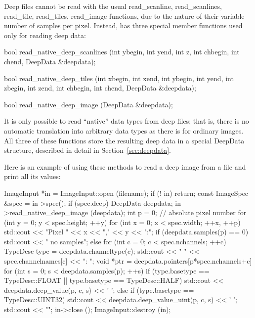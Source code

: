 Deep files cannot be read with the usual {\cf read_scanline}, {\cf
  read_scanlines}, {\cf read_tile}, {\cf read_tiles}, {\cf read_image}
functions, due to the nature of their variable number of samples per
pixel.  Instead, \ImageInput has three special member functions used
only for reading deep data:

\begin{code}
    bool read_native_deep_scanlines (int ybegin, int yend, int z,
                                     int chbegin, int chend,
                                     DeepData &deepdata);

    bool read_native_deep_tiles (int xbegin, int xend, int ybegin, int yend,
                                 int zbegin, int zend,
                                 int chbegin, int chend, DeepData &deepdata);

    bool read_native_deep_image (DeepData &deepdata);
\end{code}

It is only possible to read ``native'' data types from deep files; that
is, there is no automatic translation into arbitrary data types as there
is for ordinary images.  All three of these functions store the
resulting deep data in a special {\cf DeepData} structure, described in
detail in Section~\ref{sec:deepdata}.

Here is an example of using these methods to read a deep image from 
a file and print all its values:

\begin{code}
    ImageInput *in = ImageInput::open (filename);
    if (! in)
        return;
    const ImageSpec &spec = in->spec();
    if (spec.deep) {
        DeepData deepdata;
        in->read_native_deep_image (deepdata);
        int p = 0;  // absolute pixel number
        for (int y = 0; y < spec.height;  ++y) {
            for (int x = 0;  x < spec.width;  ++x, ++p) {
                std::cout << "Pixel " << x << "," << y << ":\n";
                if (deepdata.samples(p) == 0)
                    std::cout << "  no samples\n";
                else
                    for (int c = 0;  c < spec.nchannels;  ++c) {
                        TypeDesc type = deepdata.channeltype(c);
                        std::cout << "  " << spec.channelnames[c] << ": ";
                        void *ptr = deepdata.pointers[p*spec.nchannels+c]
                        for (int s = 0; s < deepdata.samples(p); ++s) {
                            if (type.basetype == TypeDesc::FLOAT ||
                                type.basetype == TypeDesc::HALF)
                                std::cout << deepdata.deep_value(p, c, s) << ' ';
                            else if (type.basetype == TypeDesc::UINT32)
                                std::cout << deepdata.deep_value_uint(p, c, s) << ' ';
                        }
                        std::cout << "\n";
                    }
            }
        }
    }
    in->close ();
    ImageInput::destroy (in);
\end{code}


